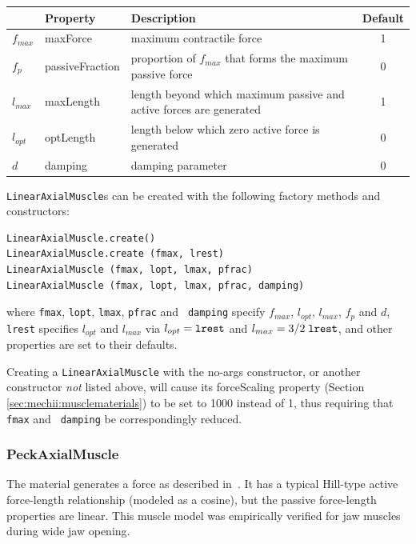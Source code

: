 \begin{center}
\begin{tabular}{|l|l|l|c|} \hline
& Property & Description & Default \\
\hline
$f_{max}$ & {\sf maxForce} & maximum contractile force & 1 \\
$f_{p}$ & {\sf passiveFraction} & 
proportion of $f_{max}$ that forms the maximum passive force & 0 \\
$l_{max}$ & {\sf maxLength} &
length beyond which maximum passive and active forces are generated & 1 \\
$l_{opt}$ & {\sf optLength} &
length below which zero active force is generated & 0 \\
$d$ & {\sf damping} & damping parameter & 0 \\
\hline
\end{tabular}
\end{center}

{\tt LinearAxialMuscle}s can be created with the following factory
methods and constructors:
\begin{lstlisting}[]
LinearAxialMuscle.create()
LinearAxialMuscle.create (fmax, lrest)
LinearAxialMuscle (fmax, lopt, lmax, pfrac)
LinearAxialMuscle (fmax, lopt, lmax, pfrac, damping)
\end{lstlisting}
%
where {\tt fmax}, {\tt lopt}, {\tt lmax}, {\tt pfrac} and {\tt
damping} specify $f_{max}$, $l_{opt}$, $l_{max}$, $f_{p}$ and $d$,
{\tt lrest} specifies $l_{opt}$ and $l_{max}$ via
$l_{opt} = \mathrm{\tt lrest}$ and
$l_{max} = 3/2 \; \mathrm{\tt lrest}$, and other properties are set to
their defaults.

\begin{sideblock}
Creating a {\tt LinearAxialMuscle} with the no-args constructor, or
another constructor {\it not} listed above, will cause its {\sf
forceScaling} property (Section \ref{sec:mechii:musclematerials}) to
be set to 1000 instead of 1, thus requiring that {\tt fmax} and {\tt
damping} be correspondingly reduced.
\end{sideblock}

\subsubsection{PeckAxialMuscle}

The 
material generates a force as described in~\cite{peck2000dynamic}. 
It has a typical Hill-type active force-length relationship (modeled
as a cosine), but the passive force-length properties are linear. This
muscle model was empirically verified for jaw muscles during wide jaw
opening.

